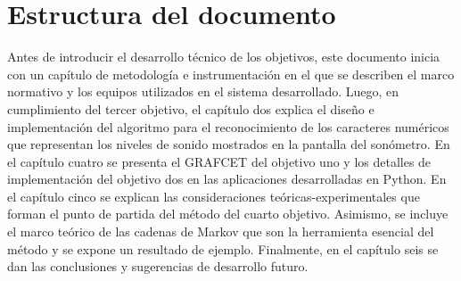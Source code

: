 \section{Estructura del documento}
Antes de introducir el desarrollo técnico de los objetivos, este documento inicia con un capítulo de metodología e
instrumentación en el que se describen el marco normativo y los equipos utilizados en el sistema desarrollado.
Luego, en cumplimiento del tercer objetivo, el capítulo dos explica el diseño e implementación del algoritmo
para el reconocimiento de los caracteres numéricos que representan los niveles de sonido mostrados en la pantalla del
sonómetro.
En el capítulo cuatro se presenta el GRAFCET del objetivo uno y los detalles de implementación del objetivo dos en las
aplicaciones desarrolladas en Python.
En el capítulo cinco se explican las consideraciones teóricas-experimentales que forman el punto de partida del método
del cuarto objetivo.
Asimismo, se incluye el marco teórico de las cadenas de Markov que son la herramienta esencial del
método y se expone un resultado de ejemplo.
Finalmente, en el capítulo seis se dan las conclusiones y sugerencias de desarrollo futuro.